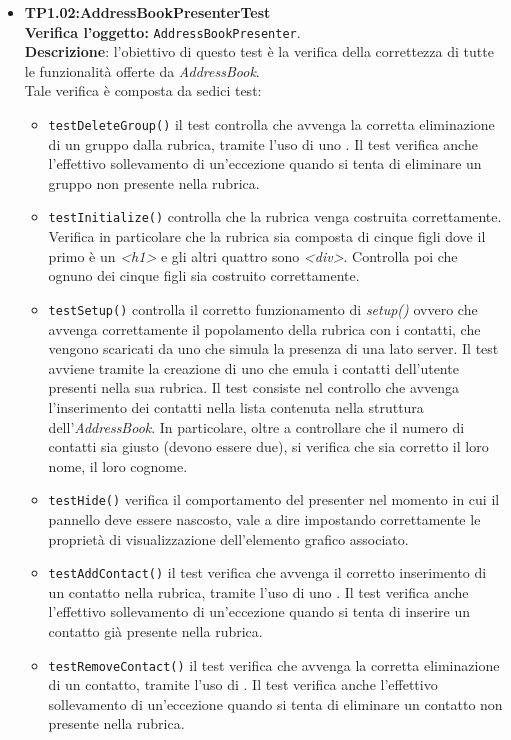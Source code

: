 \begin{itemize}
\item \textbf{TP1.02:AddressBookPresenterTest}\\  %
\textbf{Verifica l'oggetto:} \texttt{AddressBookPresenter}.\\
\textbf{Descrizione}: l'obiettivo di questo test è la verifica della correttezza di tutte le funzionalità offerte da \textit{AddressBook}.\\
Tale verifica è composta da sedici test:
\begin{itemize}
\item \texttt{testDeleteGroup()} il test controlla che avvenga la corretta eliminazione di un gruppo dalla rubrica, tramite l'uso di uno . Il test verifica anche l'effettivo sollevamento di un'eccezione quando si tenta di eliminare un gruppo non presente nella rubrica.
\item \texttt{testInitialize()} controlla che la rubrica venga costruita correttamente. Verifica in particolare che la rubrica sia composta di cinque figli dove il primo è un \textit{<h1>} e gli altri quattro sono \textit{<div>}. Controlla poi che ognuno dei cinque figli sia costruito correttamente. 
\item \texttt{testSetup()} controlla il corretto funzionamento di \textit{setup()} ovvero che avvenga correttamente il popolamento della rubrica con i contatti, che vengono scaricati da uno  che simula la presenza di una  lato server. 
Il test avviene tramite la creazione di uno  che emula i contatti dell'utente presenti nella sua rubrica. 
Il test consiste nel controllo che avvenga l'inserimento dei contatti nella lista contenuta nella struttura dell'\textit{AddressBook}. In particolare, oltre a controllare che il numero di contatti sia giusto (devono essere due), si verifica che sia corretto il loro nome, il loro cognome.
\item \texttt{testHide()} verifica il comportamento del presenter nel momento in cui il pannello deve essere nascosto, vale a dire impostando correttamente le proprietà di visualizzazione dell'elemento grafico associato.
\item \texttt{testAddContact()} il test verifica che avvenga il corretto inserimento di un contatto nella rubrica, tramite l'uso di uno . Il test verifica anche l'effettivo sollevamento di un'eccezione quando si tenta di inserire un contatto già presente nella rubrica.
\item \texttt{testRemoveContact()} il test verifica che avvenga la corretta eliminazione di un contatto, tramite l'uso di . Il test verifica anche l'effettivo sollevamento di un'eccezione quando si tenta di eliminare un contatto non presente nella rubrica.

\end{itemize}
\end{itemize}

